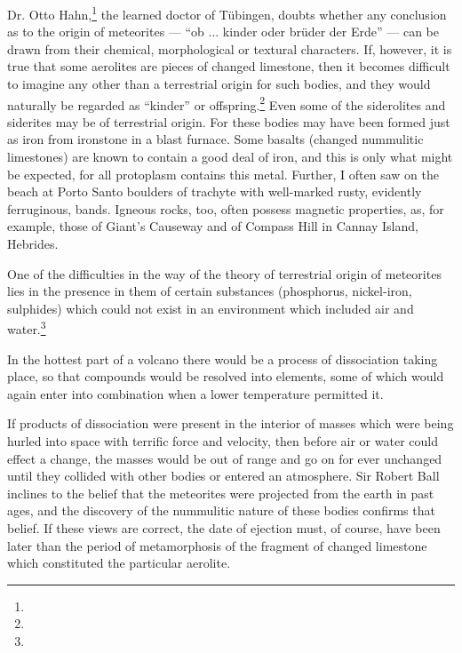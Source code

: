 \documentclass[a4paper, 12pt, oneside]{article}
\begin{document}
Dr. Otto Hahn,\footnote{} the learned doctor of Tübingen, doubts whether any conclusion as to the origin of meteorites --- ``ob ... kinder oder brüder der Erde'' --- can be drawn from their chemical, morphological or textural characters. If, however, it is true that some aerolites are pieces of changed limestone, then it becomes difficult to imagine any other than a terrestrial origin for such bodies, and they would naturally be regarded as ``kinder'' or offspring.\footnote{} Even some of the siderolites and siderites may be of terrestrial origin. For these bodies may have been formed just as iron from ironstone in a blast furnace. Some basalts (changed nummulitic limestones) are known to contain a good deal of iron, and this is only what might be expected, for all protoplasm contains this metal. Further, I often saw on the beach at Porto Santo boulders of trachyte with well-marked rusty, evidently ferruginous, bands. Igneous rocks, too, often possess magnetic properties, as, for example, those of Giant's Causeway and of Compass Hill in Cannay Island, Hebrides.

One of the difficulties in the way of the theory of terrestrial origin of meteorites lies in the presence in them of certain substances (phosphorus, nickel-iron, sulphides) which could not exist in an environment which included air and water.\footnote{}

In the hottest part of a volcano there would be a process of dissociation taking place, so that compounds would be resolved into elements, some of which would again enter into combination when a lower temperature permitted it.

If products of dissociation were present in the interior of masses which were being hurled into space with terrific force and velocity, then before air or water could effect a change, the masses would be out of range and go on for ever unchanged until they collided with other bodies or entered an atmosphere. Sir Robert Ball inclines to the belief that the meteorites were projected from the earth in past ages, and the discovery of the nummulitic nature of these bodies confirms that belief. If these views are correct, the date of ejection must, of course, have been later than the period of metamorphosis of the fragment of changed limestone which constituted the particular aerolite.
\end{document}
